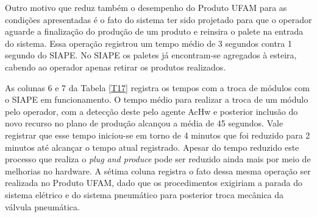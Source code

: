 \documentclass[10pt,letterpaper,twocolumn]{IEEEtran}
\begin{document}
Outro motivo que reduz também o desempenho do Produto UFAM para as condições apresentadas é o fato do sistema ter sido projetado para que o operador aguarde a finalização do produção de um produto e reinsira o palete na entrada do sistema. Essa operação registrou um tempo médio de 3 segundos contra 1 segundo do SIAPE. No SIAPE os paletes já encontram-se agregados à esteira, cabendo ao operador apenas retirar os produtos realizados. 

As colunas 6 e 7 da Tabela \ref{T17} registra os tempos com a troca de módulos com o SIAPE em funcionamento. O tempo médio para realizar a troca de um módulo pelo operador, com a detecção deste pelo agente AcHw e posterior inclusão do novo recurso no plano de produção alcançou a média de 45 segundos. Vale registrar que esse tempo iniciou-se em torno de 4 minutos que foi reduzido para 2 minutos até alcançar o tempo atual registrado. Apesar do tempo reduzido este processo que realiza o \textit{plug and produce} pode ser reduzido ainda mais por meio de melhorias no hardware.  A sétima coluna registra o fato dessa mesma operação ser realizada no Produto UFAM, dado que os procedimentos exigiriam a parada do sistema elétrico e do sistema pneumático para posterior troca mecânica da válvula pneumática.



\end{document}
